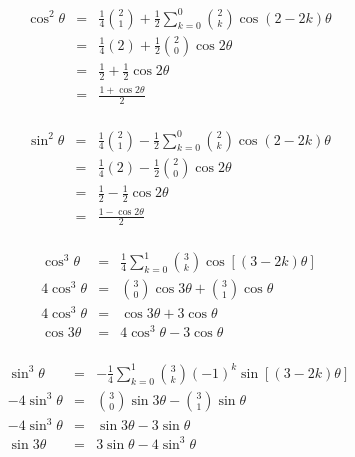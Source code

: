 \documentclass[letterpaper,12pt,fleqn]{article}
\renewcommand{\o}{\theta}
\begin{document}
\begin{example}
\begin{eqnarray*}
\cos^2\o &=& \frac{1}{4}\binom{2}{1}+
    \frac{1}{2}\sum_{k=0}^0\binom{2}{k}\cos(2-2k)\o \\
    &=& \frac{1}{4}(2)+\frac{1}{2}\binom{2}{0}\cos2\o \\
    &=& \frac{1}{2}+\frac{1}{2}\cos2\o \\
    &=& \frac{1+\cos2\o}{2} \\
\end{eqnarray*}

\begin{eqnarray*}
\sin^2\o &=& \frac{1}{4}\binom{2}{1}-
    \frac{1}{2}\sum_{k=0}^0\binom{2}{k}\cos(2-2k)\o \\
    &=& \frac{1}{4}(2)-\frac{1}{2}\binom{2}{0}\cos2\o \\
    &=& \frac{1}{2}-\frac{1}{2}\cos2\o \\
    &=& \frac{1-\cos2\o}{2} \\
\end{eqnarray*}

\begin{eqnarray*}
\cos^3\o &=& \frac{1}{4}\sum_{k=0}^1\binom{3}{k}\cos[(3-2k)\o] \\
4\cos^3\o &=& \binom{3}{0}\cos3\o+\binom{3}{1}\cos\o \\
4\cos^3\o &=& \cos3\o+3\cos\o \\
\cos3\o &=& 4\cos^3\o-3\cos\o \\
\end{eqnarray*}

\begin{eqnarray*}
\sin^3\o &=& -\frac{1}{4}\sum_{k=0}^1\binom{3}{k}(-1)^k\sin[(3-2k)\o] \\
-4\sin^3\o &=& \binom{3}{0}\sin3\o-\binom{3}{1}\sin\o \\
-4\sin^3\o &=& \sin3\o-3\sin\o \\
\sin3\o &=& 3\sin\o-4\sin^3\o \\
\end{eqnarray*}
\end{example}
\end{document}
